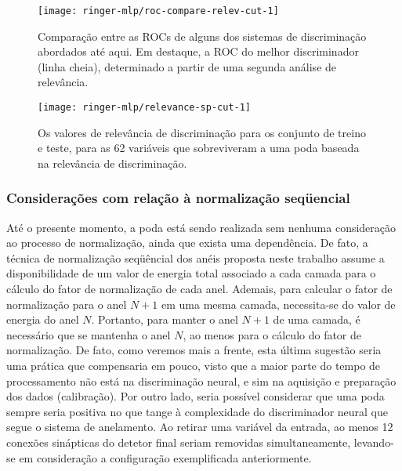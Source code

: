 \begin{figure}
\begin{center}
\texttt{[image: ringer-mlp/roc-compare-relev-cut-1]}
\end{center}
\caption{Comparação entre as ROCs de alguns dos sistemas de discriminação
abordados até aqui. Em destaque, a ROC do melhor discriminador (linha cheia),
determinado a partir de uma segunda análise de relevância.}
\label{fig:ringer-mlp-relev-cut-1}
\end{figure}

\begin{figure}
\begin{center}
\texttt{[image: ringer-mlp/relevance-sp-cut-1]}
\end{center}
\caption{Os valores de relevância de discriminação para os conjunto de treino
e teste, para as 62 variáveis que sobreviveram a uma poda baseada na
relevância de discriminação.}
\label{fig:cut-1-relevance-sp}
\end{figure}

\subsubsection{Considerações com relação à normalização seqüencial}

Até o presente momento, a poda está sendo realizada sem nenhuma consideração
ao processo de normalização, ainda que exista uma dependência. De fato, a
técnica de normalização seqüêncial dos anéis proposta neste trabalho assume a
disponibilidade de um valor de energia total associado a cada camada para o
cálculo do fator de normalização de cada anel. Ademais, para calcular o fator
de normalização para o anel $N+1$ em uma mesma camada, necessita-se do valor
de energia do anel $N$. Portanto, para manter o anel $N+1$ de uma camada, é
necessário que se mantenha o anel $N$, ao menos para o cálculo do fator de
normalização. De fato, como veremos mais a frente, esta última sugestão seria
uma prática que compensaria em pouco, visto que a maior parte do tempo de
processamento não está na discriminação neural, e sim na aquisição e
preparação dos dados (calibração). Por outro lado, seria possível considerar
que uma poda sempre seria positiva no que tange à complexidade do
discriminador neural que segue o sistema de anelamento. Ao retirar uma
variável da entrada, ao menos 12 conexões sinápticas do detetor final seriam
removidas simultaneamente, levando-se em consideração a configuração
exemplificada anteriormente.

